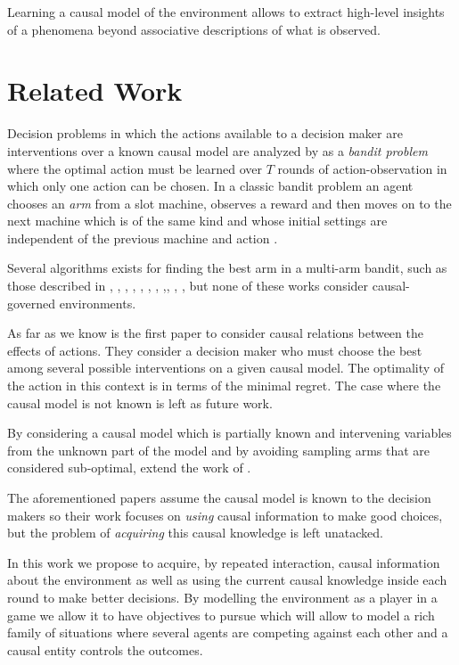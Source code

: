 \documentclass{article}
\begin{document}
Learning a causal model of the environment allows to extract high-level insights of a phenomena beyond associative descriptions of what is observed.

\section{Related Work}
Decision problems in which the actions available to a decision maker are interventions over a known causal model are analyzed by \cite{lattimoreNIPS2016} as a \textit{bandit problem} where the optimal action must be learned over $T$ rounds of action-observation in which only one action can be chosen. In a classic bandit problem an agent chooses an \textit{arm} from a slot machine, observes a reward and then moves on to the next machine which is of the same kind and whose initial settings are independent of the previous machine and action \cite{sutton1998reinforcement}.

Several algorithms exists for finding the best arm in a multi-arm bandit, such as those described in \cite{bubeck2009pure}, \cite{audibert2010best}, \cite{gabillon2012best}, \cite{agarwal2014taming} , \cite{jamieson2014lil},  \cite{jamieson2014best},  \cite{ortega2014generalized}, \cite{chen2015optimal},\cite{carpentier2016tight}, \cite{russo2016simple},  \cite{kaufmann2016complexity}, but none of these works consider causal-governed environments.

As far as we know \cite{lattimoreNIPS2016} is the first paper to consider causal relations between the effects of actions. They consider a decision maker who must choose the best among several possible interventions on a given causal model. The optimality of the action in this context is in terms of the minimal regret. The case where the causal model is not known is left as future work.

By considering a causal model which is partially known and intervening variables from the unknown part of the model and by avoiding sampling arms that are considered sub-optimal, \cite{sen2017identifying} extend the work of \cite{lattimoreNIPS2016}.

The aforementioned papers assume the causal model is known to the decision makers so their work focuses on \textit{using} causal information to make good choices, but the problem of \textit{acquiring} this causal knowledge is left unatacked.

In this work we propose to acquire, by repeated interaction, causal information about the environment as well as using the current causal knowledge inside each round to make better decisions. By modelling the environment as a player in a game we allow it to have objectives to pursue which will allow to model a rich family of situations where several agents are competing against each other and a causal entity controls the outcomes. 
\end{document}
